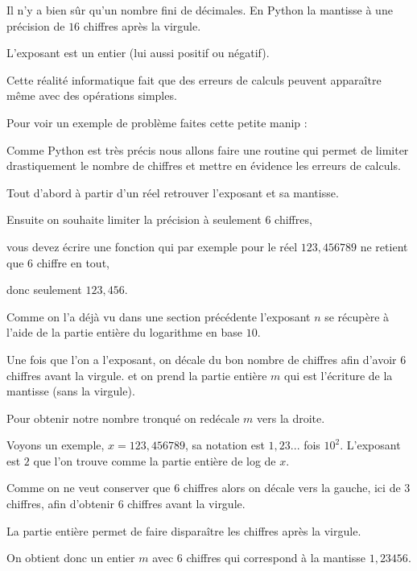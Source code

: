 Il n'y a bien sûr qu'un nombre fini de décimales.
En Python la mantisse à une précision de 
$16$ chiffres après la virgule. 

\change

L'exposant est un entier (lui aussi positif ou négatif).

\change

Cette réalité informatique fait que des erreurs de calculs peuvent 
apparaître même avec des opérations simples.


Pour voir un exemple de problème faites cette petite manip :


\diapo

Comme Python est très précis nous allons faire une routine qui permet 
de limiter drastiquement le nombre de chiffres et mettre en évidence les erreurs de calculs.

Tout d'abord à partir d'un réel retrouver l'exposant et sa mantisse.


Ensuite on souhaite limiter la précision à seulement $6$ chiffres,

vous devez écrire une fonction qui par exemple pour le réel $123,456789$ ne retient que $6$ chiffre en tout,

donc seulement $123,456$.


\change

Comme on l'a déjà vu dans une section précédente l'exposant $n$ se récupère 
à l'aide de la partie entière du logarithme en base $10$.

\change

Une fois que l'on a l'exposant, on décale du bon nombre de chiffres
afin d'avoir $6$ chiffres avant la virgule.
et on prend la partie entière $m$ qui est l'écriture de la mantisse (sans la virgule). 

\change

Pour obtenir notre nombre tronqué on redécale $m$ vers la droite.

\change

Voyons un exemple, $x=123,456789$, sa notation est $1,23...$ fois $10^2$.
L'exposant est $2$ que l'on trouve comme la partie entière de log de $x$.

Comme on ne veut conserver que $6$ chiffres alors on décale vers la gauche, ici de $3$ chiffres,
afin d'obtenir $6$ chiffres avant la virgule. 

La partie entière permet de faire disparaître les chiffres après la virgule.

On obtient donc un entier $m$ avec $6$ chiffres qui correspond à la mantisse $1,23456$.


